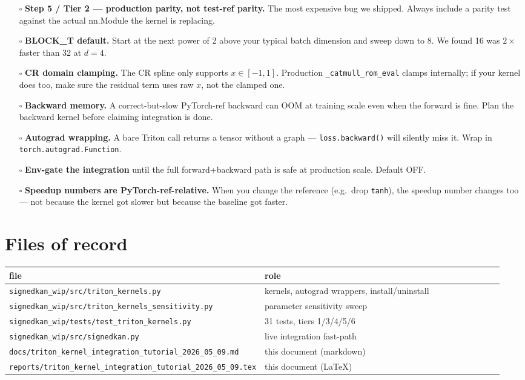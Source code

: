 \documentclass[11pt,a4paper]{article}
\begin{document}
\begin{itemize}[leftmargin=2em]
  \item[$\square$] \textbf{Step 5 / Tier 2 — production parity, not test-ref parity.} The most expensive bug we shipped. Always include a parity test against the actual nn.Module the kernel is replacing.
  \item[$\square$] \textbf{BLOCK\_T default.} Start at the next power of 2 above your typical batch dimension and sweep down to 8. We found 16 was $2\times$ faster than 32 at $d=4$.
  \item[$\square$] \textbf{CR domain clamping.} The CR spline only supports $x \in [-1, 1]$. Production \texttt{\_catmull\_rom\_eval} clamps internally; if your kernel does too, make sure the residual term uses raw $x$, not the clamped one.
  \item[$\square$] \textbf{Backward memory.} A correct-but-slow PyTorch-ref backward can OOM at training scale even when the forward is fine. Plan the backward kernel before claiming integration is done.
  \item[$\square$] \textbf{Autograd wrapping.} A bare Triton call returns a tensor without a graph --- \texttt{loss.backward()} will silently miss it. Wrap in \texttt{torch.autograd.Function}.
  \item[$\square$] \textbf{Env-gate the integration} until the full forward+backward path is safe at production scale. Default OFF.
  \item[$\square$] \textbf{Speedup numbers are PyTorch-ref-relative.} When you change the reference (e.g.\ drop \texttt{tanh}), the speedup number changes too --- not because the kernel got slower but because the baseline got faster.
\end{itemize}

\section{Files of record}

\begin{center}
\begin{tabular}{p{0.45\linewidth} p{0.5\linewidth}}
\toprule
\textbf{file} & \textbf{role} \\
\midrule
\texttt{signedkan\_wip/src/triton\_kernels.py}              & kernels, autograd wrappers, install/uninstall \\
\texttt{signedkan\_wip/src/triton\_kernels\_sensitivity.py} & parameter sensitivity sweep \\
\texttt{signedkan\_wip/tests/test\_triton\_kernels.py}      & 31 tests, tiers 1/3/4/5/6 \\
\texttt{signedkan\_wip/src/signedkan.py}                    & live integration fast-path \\
\texttt{docs/triton\_kernel\_integration\_tutorial\_2026\_05\_09.md} & this document (markdown) \\
\texttt{reports/triton\_kernel\_integration\_tutorial\_2026\_05\_09.tex} & this document (\LaTeX{}) \\
\bottomrule
\end{tabular}
\end{center}
\end{document}
